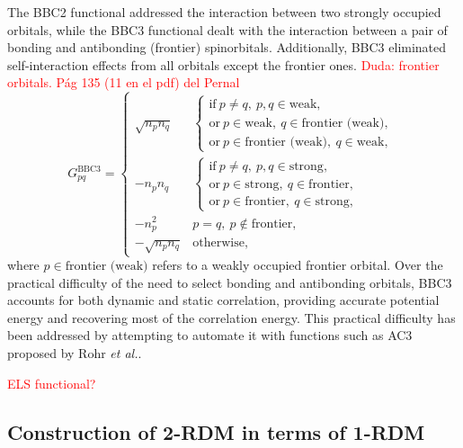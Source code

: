 The BBC2 functional addressed the interaction between two strongly occupied
orbitals, while the BBC3 functional dealt with the interaction between a pair 
of bonding and antibonding (frontier) spinorbitals.
Additionally, BBC3 eliminated self-interaction effects from all orbitals except
the frontier ones.
\textcolor{red}{Duda: frontier orbitals. Pág 135 (11 en el pdf) del Pernal} 
\begin{equation}
    G_{pq}^{\text{BBC3}} =
    \begin{cases}
        \sqrt{n_p n_q} &
        \begin{cases}
            \text{if}\ p\not=q,\ p,q \in \text{weak}, \\
            \text{or}\ p \in \text{weak},\ q \in \text{frontier (weak)}, \\
            \text{or}\ p \in \text{frontier (weak)},\ q \in \text{weak},
        \end{cases} \\
        -n_p n_q &
        \begin{cases}
            \text{if}\ p\not=q,\ p,q \in \text{strong}, \\
            \text{or}\ p \in \text{strong},\ q \in \text{frontier}, \\
            \text{or}\ p \in \text{frontier},\ q \in \text{strong},
        \end{cases} \\
        -n_p^{2} & p=q,\ p\not\in \text{frontier}, \\
        - \sqrt{n_p n_q} & \text{otherwise},
    \end{cases}
\end{equation}
where $p \in \text{frontier (weak)}$ refers to a weakly occupied frontier orbital.
Over the practical difficulty of the need to select bonding and antibonding
orbitals, BBC3 accounts for both dynamic and static correlation, providing 
accurate potential energy and recovering most of the correlation energy. 
This practical difficulty has been addressed by attempting to automate it with
functions such as AC3 proposed by Rohr \textit{et al.}.

\textcolor{red}{ELS functional?}

\subsection{Construction of 2-RDM in terms of 1-RDM}


